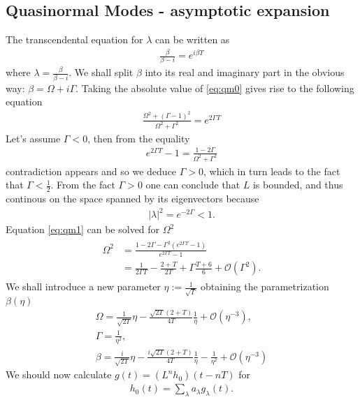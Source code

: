 \documentclass[
a4paper,%
10pt,%
titlepage,%
twoside%
]{article}
\begin{document}
\subsection{Quasinormal Modes - asymptotic expansion}
The transcendental equation for $\lambda$ can be written as
\begin{gather}\label{eq:qm0}
  \frac{\beta}{\beta-i}=e^{i\beta T}
\end{gather}
where $\lambda=\frac{\beta}{\beta-i}$. We shall split $\beta$ into its
real and imaginary part in the obvious way: $\beta=\Omega+i\Gamma$.
Taking the absolute value of \eqref{eq:qm0} gives rise to the
following equation
\begin{gather}\label{eq:qm1}
  \frac{\Omega^2+(\Gamma-1)^2}{\Omega^2+\Gamma^2}=e^{2\Gamma T}
\end{gather}
Let's assume $\Gamma<0$, then from the equality
\begin{gather}
  e^{2\Gamma T}-1=\frac{1-2\Gamma}{\Omega^2+\Gamma^2}
\end{gather}
contradiction appears and so we deduce $\Gamma>0$, which in turn leads
to the fact that $\Gamma<\frac{1}{2}$. From the fact $\Gamma>0$ one
can conclude that $L$ is bounded, and thus continous on the space spanned
by its eigenvectors because
\begin{gather}
|\lambda|^2=e^{-2\Gamma}<1.
\end{gather}
Equation
\eqref{eq:qm1} can be solved for $\Omega^2$
\begin{gather}
  \begin{split}
    \Omega^2&=\frac{1-2\Gamma-\Gamma^2(e^{2\Gamma T}-1)}{e^{2\Gamma T}-1}\\
    &=\frac{1}{2\Gamma T}-\frac{2+T}{2T}+\Gamma\frac{T+6}{6}+\mathcal{O}(\Gamma^2).
  \end{split}
\end{gather}
We shall introduce a new parameter $\eta:=\frac{1}{\sqrt{\Gamma}}$ obtaining
the parametrization $\beta(\eta)$
\begin{gather}\label{eq:qmparam}
  \Omega=\frac{1}{\sqrt{2 T}}\eta-\frac{\sqrt{2T}(2+T)}{4T}\frac{1}{\eta}+\mathcal{O}(\eta^{-3}),\\
  \Gamma=\frac{1}{\eta^2},\\
  \beta=\frac{i}{\sqrt{2 T}}\eta-\frac{i\sqrt{2T}(2+T)}{4T}\frac{1}{\eta}-\frac{1}{\eta^2}+\mathcal{O}(\eta^{-3})
\end{gather}
We should now calculate $g(t)=(L^n h_0)(t-nT)$ for
\begin{gather}
  h_0(t)=\sum_\lambda a_\lambda g_\lambda(t).
\end{gather}
\end{document}
